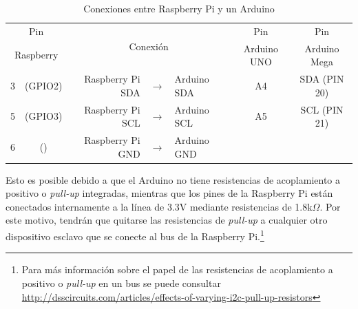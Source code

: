 \begin{table}
	\centering
	\caption{Conexiones \IIC entre Raspberry Pi y un Arduino}
	\label{tbl:pi-arduino-i2c} %
	\begin{tabularx}{0.8\linewidth}{cc rcl c c}
	\toprule
	\multicolumn{2}{c}{   Pin   } & \multicolumn{3}{c}{\multirow{2}{*}{Conexión}}  &     Pin     &     Pin     \\
	\multicolumn{2}{c}{Raspberry} & \multicolumn{3}{c}{}                           & Arduino UNO & Arduino Mega \\
	\midrule
	       3 & (GPIO2)            & Raspberry Pi SDA & $\rightarrow$ & Arduino SDA & A4          & SDA (PIN 20) \\
	       5 & (GPIO3)            & Raspberry Pi SCL & $\rightarrow$ & Arduino SCL & A5          & SCL (PIN 21) \\
	       6 & (\GND)             & Raspberry Pi GND & $\rightarrow$ & Arduino GND & \GND        & \GND         \\
	\bottomrule
	\end{tabularx}
\end{table}


Esto es posible debido a que el Arduino no tiene resistencias de acoplamiento a positivo o \emph{pull-up} integradas, mientras que los pines \IIC de la Raspberry Pi están conectados internamente a la línea de 3.3V mediante resistencias de 1.8k$\Omega$.
Por este motivo, tendrán que quitarse las resistencias de \emph{pull-up} a cualquier otro dispositivo esclavo que se conecte al bus \IIC de la Raspberry Pi.\footnote{Para más información sobre el papel de las resistencias de acoplamiento a positivo o \emph{pull-up} en un bus \IIC se puede consultar \url{http://dsscircuits.com/articles/effects-of-varying-i2c-pull-up-resistors} }
